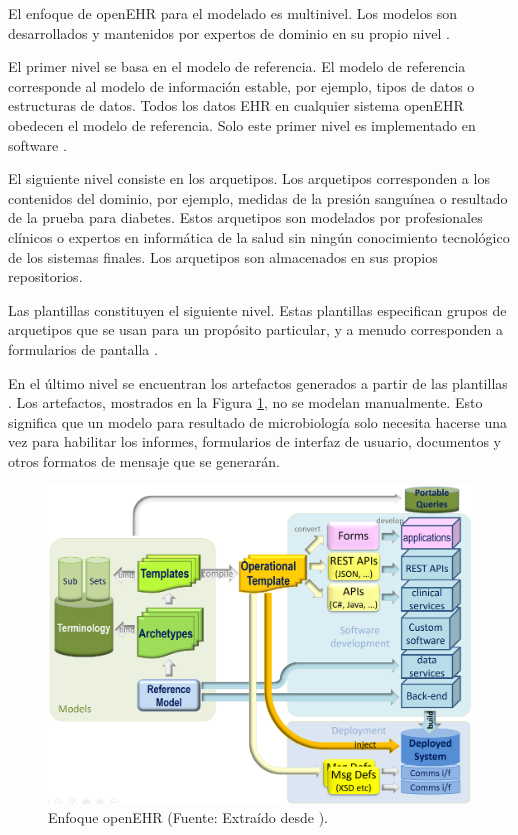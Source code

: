 El enfoque de openEHR para el modelado es multinivel. Los modelos son desarrollados y mantenidos por expertos de dominio en su propio nivel \cite{openEHRArchitecture}.

El primer nivel se basa en el modelo de referencia. El modelo de referencia corresponde al modelo de información estable, por ejemplo, tipos de datos o estructuras de datos. Todos los datos EHR en cualquier sistema openEHR obedecen el modelo de referencia. Solo este primer nivel es implementado en software \cite{openEHRArchitecture}.

El siguiente nivel consiste en los arquetipos. Los arquetipos corresponden a los contenidos del dominio, por ejemplo, medidas de la presión sanguínea o resultado de la prueba para diabetes. Estos arquetipos son modelados por profesionales clínicos o expertos en informática de la salud sin ningún conocimiento tecnológico de los sistemas finales. Los arquetipos son almacenados en sus propios repositorios.

Las plantillas constituyen el siguiente nivel. Estas plantillas especifican grupos de arquetipos que se usan para un propósito particular, y a menudo corresponden a formularios de pantalla \cite{openEHRArchitecture}.

En el último nivel se encuentran los artefactos generados a partir de las plantillas \cite{openEHR}. Los artefactos, mostrados en la Figura \ref{fig:openeEHR_ecosystem}, no se modelan manualmente. Esto significa que un modelo para resultado de microbiología solo necesita hacerse una vez para habilitar los informes, formularios de interfaz de usuario, documentos y otros formatos de mensaje que se generarán.

\begin{figure}[h]
  \centering
  \includegraphics[scale=0.6]{./images/openehr_dev_ecosystem.png}
  \caption{Enfoque openEHR (Fuente: Extraído desde \cite{openEHR}).}
  \label{fig:openeEHR_ecosystem}
\end{figure}

